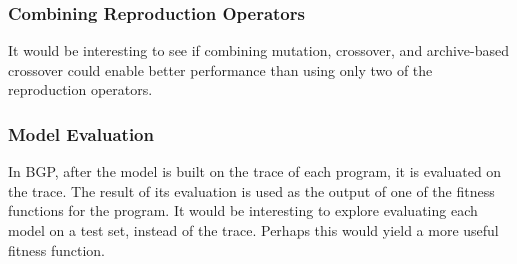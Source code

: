 \subsubsection{Combining Reproduction Operators}
It would be interesting to see if combining mutation, crossover, and archive-based crossover could enable better performance than using only two of the reproduction operators.


\subsubsection{Model Evaluation}
In BGP, after the model is built on the trace of each program, it is evaluated on the trace.  The result of its evaluation is used as the output of one of the fitness functions for the program.  It would be interesting to explore evaluating each model on a test set, instead of the trace.  Perhaps this would yield a more useful fitness function.

